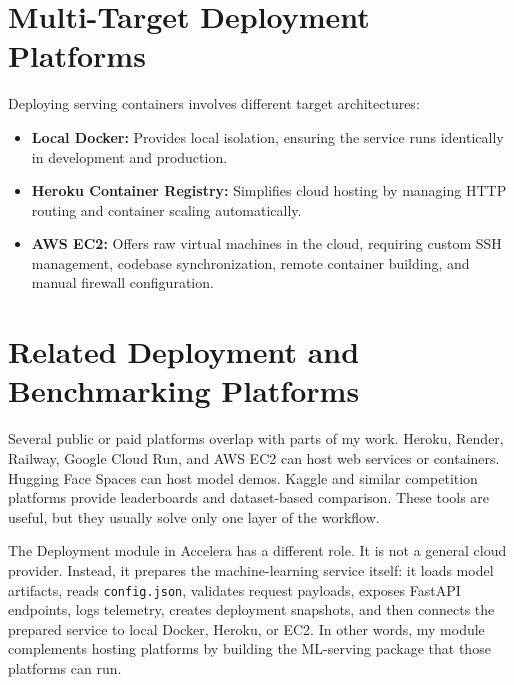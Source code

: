 \documentclass[12pt,a4paper,oneside]{report}
\newcommand{\systemname}{Accelera}
\newcommand{\modulepath}[1]{\texttt{#1}}
\begin{document}
\section{Multi-Target Deployment Platforms}
Deploying serving containers involves different target architectures:
\begin{itemize}[leftmargin=*]
    \item \textbf{Local Docker:} Provides local isolation, ensuring the service runs identically in development and production.
    \item \textbf{Heroku Container Registry:} Simplifies cloud hosting by managing HTTP routing and container scaling automatically.
    \item \textbf{AWS EC2:} Offers raw virtual machines in the cloud, requiring custom SSH management, codebase synchronization, remote container building, and manual firewall configuration.
\end{itemize}

\section{Related Deployment and Benchmarking Platforms}
Several public or paid platforms overlap with parts of my work. Heroku, Render, Railway, Google Cloud Run, and AWS EC2 can host web services or containers. Hugging Face Spaces can host model demos. Kaggle and similar competition platforms provide leaderboards and dataset-based comparison. These tools are useful, but they usually solve only one layer of the workflow.

The Deployment module in \systemname{} has a different role. It is not a general cloud provider. Instead, it prepares the machine-learning service itself: it loads model artifacts, reads \modulepath{config.json}, validates request payloads, exposes FastAPI endpoints, logs telemetry, creates deployment snapshots, and then connects the prepared service to local Docker, Heroku, or EC2. In other words, my module complements hosting platforms by building the ML-serving package that those platforms can run.
\end{document}
